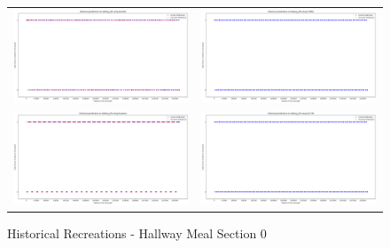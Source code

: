 \begin{figure}
  \begin{tabular}{cc}
    {\includegraphics[width = 3in]{images/results/Historical_hallway_M0_Duckett.png}} &
    {\includegraphics[width = 3in]{images/results/Historical_hallway_M0_FreMEn.png}} \\
    {\includegraphics[width = 3in]{images/results/Historical_hallway_M0_Gaussian.png}} &
    {\includegraphics[width = 3in]{images/results/Historical_hallway_M0_HyT-EM.png}} \\
  \end{tabular}
  \caption{Historical Recreations - Hallway Meal Section 0}
\end{figure}\\ \\

